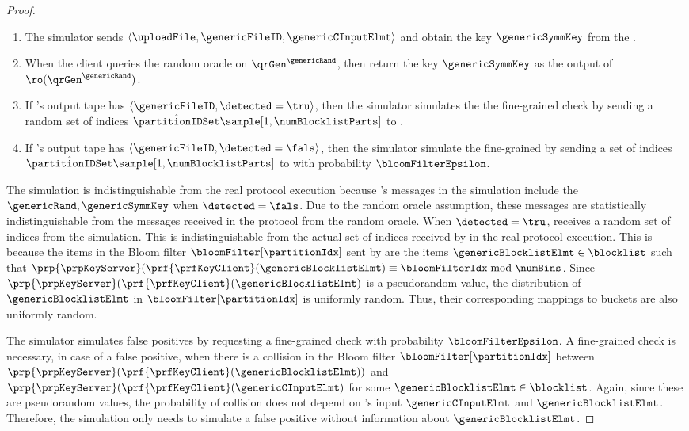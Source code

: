 \begin{proof}
\begin{enumerate}
\item  The simulator sends $\langle \uploadFile, \genericFileID, \genericCInputElmt \rangle$ and obtain the key
$\genericSymmKey$ from the \contentModFunc. 
\item When the client queries the random oracle \ro on $\qrGen^{\genericRand}$, then return the key $\genericSymmKey$ as the output of $\ro(\qrGen^{\genericRand})$. 
\item If \client's output tape has $\langle \genericFileID, \detected = \tru \rangle$, then the simulator simulates the the fine-grained check by sending a random set of indices $\hat{\partitionIDSet} \sample [1, \numBlocklistParts]$ to \client. 
\item If \client's output tape has $\langle \genericFileID, \detected = \fals \rangle$, then the simulator simulate the fine-grained by sending a set of indices $\hat{\partitionIDSet} \sample [1, \numBlocklistParts]$ to \client with probability $\bloomFilterEpsilon$. 
\end{enumerate}



The simulation is indistinguishable from the real protocol execution because \client's messages in the simulation include the $\genericRand,\genericSymmKey$ when $\detected = \fals$. Due to the random oracle assumption, these messages are statistically indistinguishable from the messages received in the protocol from the random oracle. When $\detected = \tru$, \client receives a random set of indices from the simulation. This is indistinguishable from the actual set of indices \partitionIDSet received by \client in the real protocol execution. This is because the items in the Bloom filter $\bloomFilter[\partitionIdx]$ sent by \client are the items $\genericBlocklistElmt \in \blocklist$ such that $\prp{\prpKeyServer}(\prf{\prfKeyClient}(\genericBlocklistElmt) \equiv \bloomFilterIdx \bmod \numBins$. Since $\prp{\prpKeyServer}(\prf{\prfKeyClient}(\genericBlocklistElmt)$ is a pseudorandom value, the distribution of $\genericBlocklistElmt$ in $\bloomFilter[\partitionIdx]$ is uniformly random. Thus, their corresponding mappings to buckets are also uniformly random. 

The simulator simulates false positives by requesting a fine-grained check with probability $\bloomFilterEpsilon$. A fine-grained check is necessary, in case of a false positive, when there is a collision in the Bloom filter $\bloomFilter[\partitionIdx]$ between 
$\prp{\prpKeyServer}(\prf{\prfKeyClient}(\genericBlocklistElmt))$ and $\prp{\prpKeyServer}(\prf{\prfKeyClient}(\genericCInputElmt)$ for some $\genericBlocklistElmt \in \blocklist$.  Again, since these are pseudorandom values, the probability of collision does not depend on \client's input $\genericCInputElmt$ and $\genericBlocklistElmt$. Therefore, the simulation only needs \bloomFilterEpsilon to simulate a false positive without information about $\genericBlocklistElmt$. 
\fi 

\end{proof}
